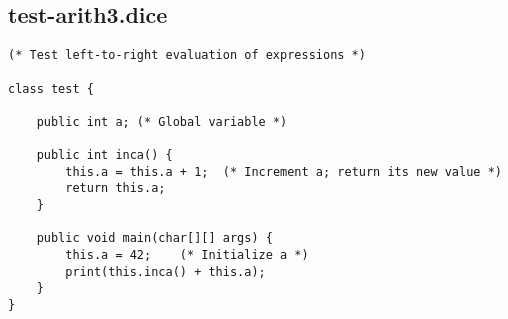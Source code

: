 \subsection{test-arith3.dice}
\begin{verbatim}
(* Test left-to-right evaluation of expressions *)

class test {

	public int a; (* Global variable *)

	public int inca() { 
		this.a = this.a + 1;  (* Increment a; return its new value *)
		return this.a; 
	} 

	public void main(char[][] args) {
  		this.a = 42;    (* Initialize a *)
  		print(this.inca() + this.a);
	}
}

\end{verbatim}